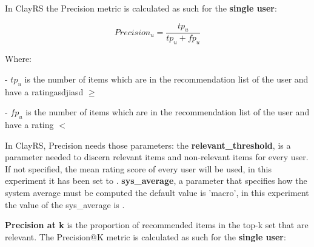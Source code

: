 \documentclass[12pt, a4paper]{article}
\begin{document}

\hfill\break
In ClayRS the Precision metric is calculated as such for the \textbf{single user}:

    \[
    Precision_u = \frac{tp_u}{tp_u + fp_u}
    \]

    Where:

    - $tp_u$ is the number of items which are in the recommendation list of the user and have a
      ratingasdjiasd $\geq$ 
        \textbf{}
        \textbf{}


    - $fp_u$ is the number of items which are in the recommendation list of the user and have a
      rating $<$ 
        \textbf{}
        \textbf{}

\hfill\break



In ClayRS, Precision needs those parameters:
\hfill\break
the \textbf{relevant\_threshold}, is a parameter needed to discern relevant items and non-relevant items for every user.
If not specified, the mean rating score of every user will be used, in this experiment it has been set to
\textbf{}.
\hfill\break\hfill\break
\textbf{sys\_average}, a parameter that specifies how the system average must be computed the default value is 'macro',
in this experiment the value of the sys\_average is \textbf{}.



\hfill\break
\textbf{Precision at k} is the proportion of recommended items in the top-k set that are relevant.
 The Precision@K metric is calculated as such for the \textbf{single user}:
\end{document}
